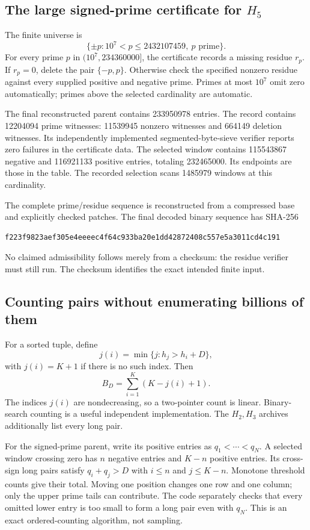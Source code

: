 \documentclass[11pt,a4paper]{article}
\theoremstyle{definition}\newtheorem{definition}[theorem]{Definition}
\theoremstyle{remark}\newtheorem{remark}[theorem]{Remark}
\numberwithin{equation}{section}
\begin{document}
\subsection{The large signed-prime certificate for \texorpdfstring{$H_5$}{H5}}
The finite universe is
\[
 \{\pm p:10^7<p\le2432107459,\ p\text{ prime}\}.
\]
For every prime $p$ in $(10^7,234360000]$, the certificate records a missing residue $r_p$. If $r_p=0$, delete the pair $\{-p,p\}$. Otherwise check the specified nonzero residue against every supplied positive and negative prime. Primes at most $10^7$ omit zero automatically; primes above the selected cardinality are automatic.

The final reconstructed parent contains 233950978 entries. The record contains 12204094 prime witnesses: 11539945 nonzero witnesses and 664149 deletion witnesses. Its independently implemented segmented-byte-sieve verifier reports zero failures in the certificate data. The selected window contains 115543867 negative and 116921133 positive entries, totaling 232465000. Its endpoints are those in the table. The recorded selection scans 1485979 windows at this cardinality.

The complete prime/residue sequence is reconstructed from a compressed base and explicitly checked patches. The final decoded binary sequence has SHA-256
\begin{lstlisting}
f223f9823aef305e4eeeec4f64c933ba20e1dd42872408c557e5a3011cd4c191
\end{lstlisting}
No claimed admissibility follows merely from a checksum: the residue verifier must still run. The checksum identifies the exact intended finite input.

\subsection{Counting pairs without enumerating billions of them}
For a sorted tuple, define
\[
 j(i)=\min\{j:h_j>h_i+D\},
\]
with $j(i)=K+1$ if there is no such index. Then
\[
 B_D=\sum_{i=1}^{K}(K-j(i)+1).
\]
The indices $j(i)$ are nondecreasing, so a two-pointer count is linear. Binary-search counting is a useful independent implementation. The $H_2,H_3$ archives additionally list every long pair.

For the signed-prime parent, write its positive entries as $q_1<\cdots<q_N$. A selected window crossing zero has $n$ negative entries and $K-n$ positive entries. Its cross-sign long pairs satisfy $q_i+q_j>D$ with $i\le n$ and $j\le K-n$. Monotone threshold counts give their total. Moving one position changes one row and one column; only the upper prime tails can contribute. The code separately checks that every omitted lower entry is too small to form a long pair even with $q_N$. This is an exact ordered-counting algorithm, not sampling.
\end{document}
